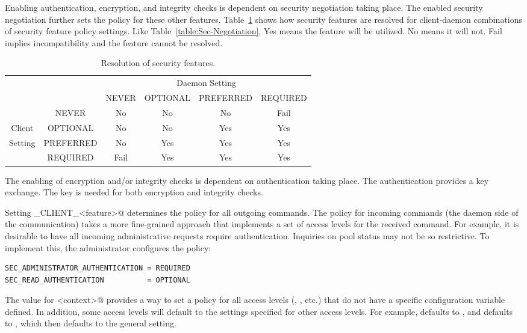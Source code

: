 Enabling authentication, encryption, and integrity checks is
dependent on security negotiation taking place.
The enabled security negotiation further sets the policy for
these other features.
Table~\ref{table:Sec-Resolution} shows how security features
are resolved for client-daemon combinations of security feature policy
settings.
Like Table~\ref{table:Sec-Negotiation},
Yes means the feature will be utilized.
No means it will not.
Fail implies incompatibility and the feature cannot be resolved.


\begin{table}[tb]
\centering
\begin{tabular}{|c|c|c|c|c|c|}
  \hline
  \multicolumn{2}{|c|}{\hfill} & \multicolumn{4}{c|}{Daemon Setting} \\
  \cline{3-6}
  \multicolumn{2}{|c|}{\hfill} & NEVER & OPTIONAL & PREFERRED & REQUIRED \\
  \hline
  \hfill & NEVER & No & No & No & Fail \\
  \cline{2-6}
  Client & OPTIONAL & No & No & Yes & Yes \\
  \cline{2-6}
  Setting & PREFERRED & No & Yes & Yes & Yes \\
  \cline{2-6}
  \hfill & REQUIRED & Fail & Yes & Yes & Yes \\
  \hline
\end{tabular}
\caption{\label{table:Sec-Resolution}Resolution of security features. }
\end{table}


The enabling of encryption and/or integrity checks is dependent on
authentication taking place.
The authentication provides a key exchange.
The key is needed for both encryption and integrity checks.

Setting \verb@SEC_CLIENT_<feature>@ determines the policy for all
outgoing commands.
The policy for incoming commands
(the daemon side of the communication)
takes a more fine-grained approach that implements a set of
access levels for the received command.
For example, it is desirable to have all incoming administrative
requests require authentication.
Inquiries on pool status may not be so restrictive.
To implement this, the administrator configures the policy:

\begin{verbatim}
SEC_ADMINISTRATOR_AUTHENTICATION = REQUIRED
SEC_READ_AUTHENTICATION          = OPTIONAL
\end{verbatim}

The \verb@DEFAULT@ value for \verb@<context>@ provides a way
to set a policy for all access levels
(\verb@READ@, \verb@WRITE@, etc.)
that do not have a specific configuration variable defined.
In addition, some access levels will default to the settings specified
for other access levels.  For example, 
defaults to , and  defaults to
, which then defaults to the general \verb@DEFAULT@
setting.

